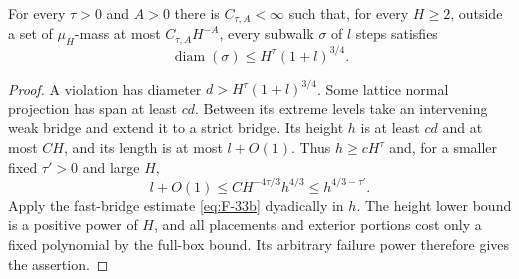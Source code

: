 \begin{proposition}\label{prop:11-modulus}
For every $\tau>0$ and $A>0$ there is $C_{\tau,A}<\infty$ such that,
for every $H\ge2$, outside a set of $\mu_H$-mass at most
$C_{\tau,A}H^{-A}$, every subwalk $\sigma$ of $l$ steps satisfies
\[
 \operatorname{diam}(\sigma)\le H^\tau(1+l)^{3/4}.
\]
\end{proposition}

\begin{proof}
A violation has diameter $d>H^\tau(1+l)^{3/4}$. Some lattice normal
projection has span at least $cd$. Between its extreme levels take
an intervening weak bridge and extend it to a strict bridge. Its
height $h$ is at least $cd$ and at most $CH$, and its length is at
most $l+O(1)$. Thus $h\ge cH^\tau$ and, for a smaller fixed
$\tau'>0$ and large $H$,
\[
 l+O(1)\le C H^{-4\tau/3}h^{4/3}\le h^{4/3-\tau'}.
\]
Apply the fast-bridge estimate \eqref{eq:F-33b} dyadically in $h$.
The height lower bound is a positive power of $H$, and all placements
and exterior portions cost only a fixed polynomial by the full-box
bound. Its arbitrary failure power therefore gives the assertion.
\end{proof}

